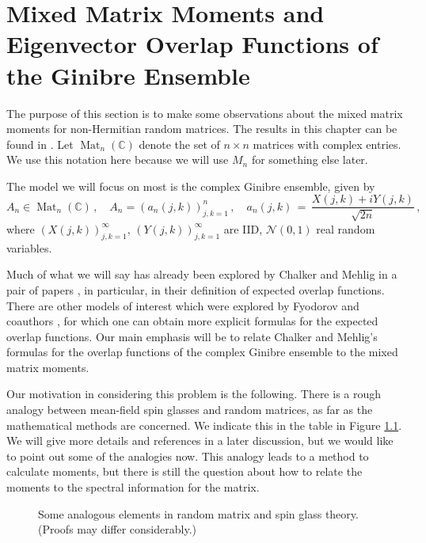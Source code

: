 \documentclass[12pt]{report}
\newcommand{\C}{\mathbb{C}}
\newcommand{\E}{\mathbb{E}}
\newcommand{\be}{\begin{equation}}
\newcommand{\ee}{\end{equation}}
\newcommand{\Mat}{\operatorname{Mat}}
\theoremstyle{definition}
\begin{document}
\chapter{Mixed Matrix Moments and Eigenvector Overlap Functions of the Ginibre Ensemble}
The purpose of this section is to make some observations about the mixed matrix moments for non-Hermitian random matrices.  The results in this chapter can be found in \cite{MWSS}.
Let $\Mat_n(\C)$ denote the set of $n\times n$ matrices with complex entries. We use this notation here because we will use $M_n$ for something else later.  

The model we will focus on most is the complex Ginibre ensemble, given by
\be
A_n \in \Mat_n(\C)\, ,\quad A_n = (a_n(j,k))_{j,k=1}^{n}\, ,\quad
a_n(j,k)\, =\, \frac{X(j,k)+iY(j,k)}{\sqrt{2n}}\, ,
\ee
where $(X(j,k))_{j,k=1}^{\infty}$, $(Y(j,k))_{j,k=1}^{\infty}$ are IID, $\mathcal{N}(0,1)$ real random variables.

Much of what we will say has already been explored by Chalker and Mehlig in a pair of papers \cite{CM,MC},
in particular, in their definition of expected overlap functions.
There are other models of interest which were explored by Fyodorov and coauthors \cite{FY1,FY2},
for which one can obtain more explicit formulas for the expected overlap functions.
Our main emphasis will be to relate Chalker and Mehlig's formulas for the overlap functions of the complex Ginibre
ensemble to the mixed matrix moments.

Our motivation in considering this problem is the following. There is a rough analogy between mean-field spin glasses and random matrices,
as far as the mathematical methods are concerned.
We indicate this in the table in Figure \ref{fig:1}.  We will give more details and references in a later discussion, but we would like to point out some of the analogies now.  
This analogy leads to a method to calculate moments, but there is still the question about how to relate
the moments to the spectral information for the matrix.
\
\begin{figure}[h]
\begin{center}
\begingroup \fontsize{10pt}{11pt}
\caption{Some analogous elements in random matrix  and spin glass theory. (Proofs may differ considerably.)  \label{fig:1}} \endgroup
\end{center}
\end{figure}
\end{document}
